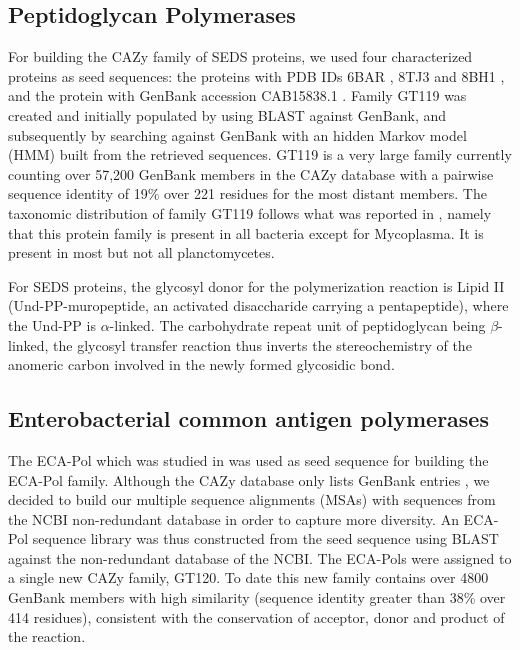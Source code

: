 \documentclass{article}
\begin{document}
\subsection{Peptidoglycan Polymerases}
For building the CAZy family of SEDS proteins, we used four characterized proteins as seed sequences: the proteins with PDB IDs 6BAR \cite{sjodt_structure_2018}, 8TJ3 \cite{nygaard_structural_2023} and 8BH1 \cite{kashammer_cryo-em_2023}, and the protein with GenBank accession CAB15838.1 \cite{emami_roda_2017}. Family GT119 was created and initially populated by using BLAST against GenBank, and subsequently by searching against GenBank with an hidden Markov model (HMM) built from the retrieved sequences. GT119 is a very large family currently counting over 57,200 GenBank members in the CAZy database with a pairwise sequence identity of 19\% over 221 residues for the most distant members. The taxonomic distribution of family GT119 follows what was reported in \cite{meeske_seds_2016}, namely that this protein family is present in all bacteria except for Mycoplasma. It is present in most but not all planctomycetes.

For SEDS proteins, the glycosyl donor for the polymerization reaction is Lipid II (Und-PP-muropeptide, an activated disaccharide carrying a pentapeptide), where the Und-PP is $\alpha$-linked. The carbohydrate repeat unit of peptidoglycan being  $\beta$-linked,  the glycosyl transfer reaction thus inverts the stereochemistry of the anomeric carbon involved in the newly formed glycosidic bond. 

\subsection{Enterobacterial common antigen polymerases}

The ECA-Pol which was studied in \cite{maczuga_interdependence_2022} was used as seed sequence for building the ECA-Pol family. Although the CAZy database only lists GenBank entries \cite{lombard_carbohydrate-active_2014}, we decided to build our multiple sequence alignments (MSAs) with sequences from the NCBI non-redundant database in order to capture more diversity. An ECA-Pol sequence library was thus constructed from the seed sequence using BLAST against the non-redundant database of the NCBI. The ECA-Pols were assigned to a single new CAZy family, GT120. To date this new family contains over 4800 GenBank members with high similarity (sequence identity greater than 38\% over 414 residues), consistent with the conservation of acceptor, donor and product of the reaction.
\end{document}

